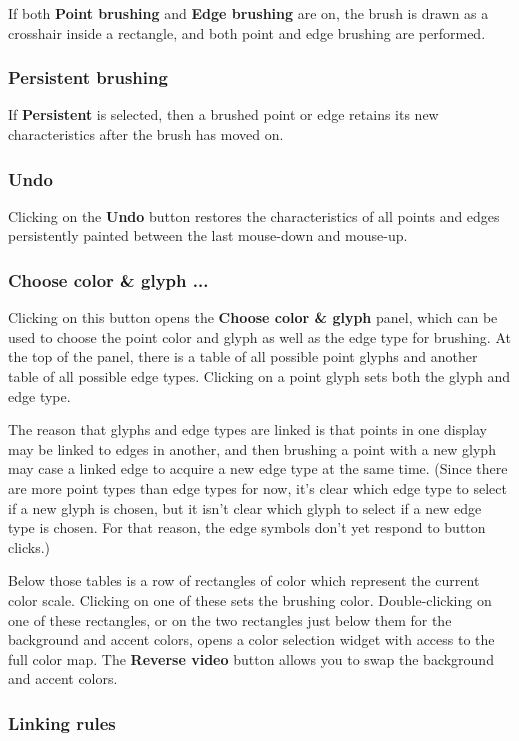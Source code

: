 \documentclass[11pt]{article}
\def\Widget#1{\textbf{#1}}
\begin{document}
If both \Widget{Point brushing} and \Widget{Edge brushing} are on, the
brush is drawn as a crosshair inside a rectangle, and both point and
edge brushing are performed.

\subsubsection{Persistent brushing}
%
If \Widget{Persistent} is selected, then a brushed point or edge
retains its new characteristics after the brush has moved on.

\subsubsection{Undo}
%
Clicking on the \Widget{Undo} button restores the characteristics of all
points and edges persistently painted between the last mouse-down and
mouse-up.

\subsubsection{Choose color \& glyph ...}

Clicking on this button opens the \Widget{Choose color \& glyph} panel,
which can be used to choose the point color and glyph as well as the
edge type for brushing.  At the top of the panel, there is a table of
all possible point glyphs and another table of all possible edge types.
Clicking on a point glyph sets both the glyph and edge type.

The reason that glyphs and edge types are linked is that points in one
display may be linked to edges in another, and then brushing a point
with a new glyph may case a linked edge to acquire a new edge type at
the same time.  (Since there are more point types than edge types for
now, it's clear which edge type to select if a new glyph is chosen,
but it isn't clear which glyph to select if a new edge type is chosen.
For that reason, the edge symbols don't yet respond to button clicks.)

Below those tables is a row of rectangles of color which represent the
current color scale.  Clicking on one of these sets the brushing
color.  Double-clicking on one of these rectangles, or on the two
rectangles just below them for the background and accent colors, opens
a color selection widget with access to the full color map.  The
\Widget{Reverse video} button allows you to swap the background and
accent colors.

\subsubsection{Linking rules}
\label{LinkingRules}
\end{document}
